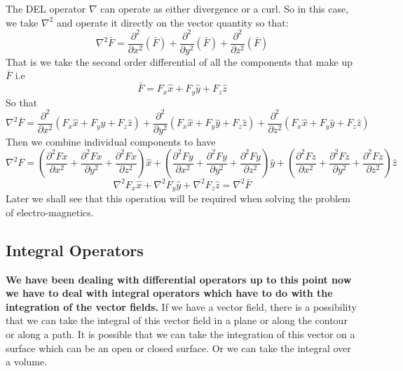 The DEL operator $\nabla$ can operate as either divergence or a curl. So in this case, we take $\nabla^2$ and operate it directly on the vector quantity so that:
\begin{dmath}
\nabla^{2} \bar{F} = \frac{\partial ^ {2}}{\partial x^{2}}(\bar{F}) + \frac{\partial ^ {2}}{\partial y^{2}}(\bar{F}) + \frac{\partial ^ {2}}{\partial z^{2}}(\bar{F})
\end{dmath}
That is we take the second order differential of all the components that make up $\bar{F}$ i.e
\begin{equation*}
\bar{F} = F_{x}\hat x + F_{y}\hat y + F_{z}\hat z
\end{equation*}
So that
\begin{dmath}
\nabla^{2} \bar{F} = \frac{\partial ^ {2}}{\partial x^{2}}(F_{x}\hat x + F_{y}\hat y + F_{z}\hat z) + \frac{\partial ^ {2}}{\partial y^{2}}(F_{x}\hat x + F_{y}\hat y + F_{z}\hat z) + 
\frac{\partial ^ {2}}{\partial z^{2}}(F_{x}\hat x + F_{y}\hat y + F_{z}\hat z)
\end{dmath}
Then we combine individual components to have
\begin{dmath*}
\nabla^{2}F = (\frac{\partial ^{2} Fx}{\partial x^2} + \frac{\partial ^{2} Fx}{\partial y^2} + \frac{\partial ^{2} Fx}{\partial z^2})\hat{x} + (\frac{\partial ^{2} Fy}{\partial x^2} + \frac{\partial ^{2} Fy}{\partial y^2} + \frac{\partial ^{2} Fy}{\partial z^2})\hat{y} + (\frac{\partial ^{2} Fz}{\partial x^2} + \frac{\partial ^{2} Fz}{\partial y^2} + \frac{\partial ^{2} Fz}{\partial z^2})\hat{z}
\end{dmath*}
\begin{dmath}
\nabla^{2}F_x \hat x + \nabla^{2}F_y \hat y + \nabla^{2}F_z \hat z = \nabla^{2}\bar{F}
\end{dmath}
Later we shall see that this operation will be required when solving the problem of electro-magnetics.

\subsection{Integral Operators}

\textbf{We have been dealing with differential operators up to this point now we have to deal with integral operators which have to do with the integration of the vector fields.} If we have a vector field, there is a possibility that we can take the integral of this vector field in a plane or along the contour or along a path. It is possible that we can take the integration of this vector on a surface which can be an open or closed surface. Or we can take the integral over a volume. 

